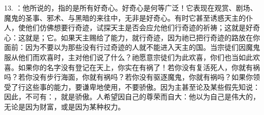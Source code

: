13. ：他所说的，指的是所有好奇心。好奇心是何等广泛！它表现在观赏、剧场、魔鬼的圣事、邪术、与黑暗的来往中，无非是好奇心。有时它甚至诱惑天主的仆人，使他们仿佛想要行奇迹，试探天主是否会应允他们行奇迹的祈祷；这就是好奇心：这就是；它。如果天主赐给了能力，就行奇迹，因为祂已把行奇迹的路放在你面前：因为不要以为那些没有行过奇迹的人就不能进入天主的国。当宗徒们因魔鬼服从他们而欢喜时，主对他们说了什么？祂愿意宗徒们为此欢喜，你们也当如此欢喜。如果你的名字没有登记在天上，你实在有祸了！若你没有复活死人，你就有祸吗？若你没有步行海面，你就有祸吗？若你没有驱逐魔鬼，你就有祸吗？如果你领受了行这些事的能力，要谦卑地使用，不要骄傲。因为主甚至论及某些假先知说：因此，不可有：，就是骄傲。人希望因自己的尊荣而自大：他以为自己是伟大的，无论是因为财富，或是因为某种权力。\par

